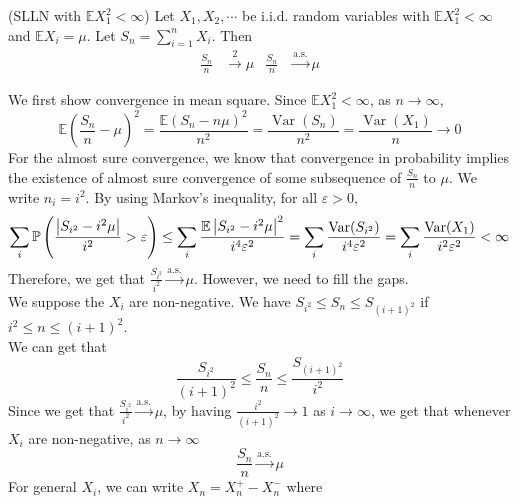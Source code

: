 \documentclass{huhtakm-template-book}
\newcommand{\prob}{\mathbb{P}}
\newcommand{\expect}{\mathbb{E}}
\DeclareMathOperator{\Var}{Var}
\begin{document}
\begin{thm}(SLLN with $\expect X_{1}^{2}<\infty$) Let $X_{1},X_{2},\cdots$ be i.i.d. random variables with $\expect X_{1}^{2}<\infty$ and $\expect X_{i}=\mu$. Let $S_{n}=\sum_{i=1}^{n}X_{i}$. Then
    \begin{align*}
        \frac{S_{n}}{n}&\xrightarrow{2}\mu & \frac{S_{n}}{n}&\xrightarrow{\text{a.s.}}\mu
    \end{align*}
\end{thm}
\begin{proofing}
    We first show convergence in mean square. Since $\expect X_{1}^{2}<\infty$, as $n\to\infty$,
    \begin{equation*}
        \expect\left(\frac{S_{n}}{n}-\mu\right)^{2}=\frac{\expect(S_{n}-n\mu)^{2}}{n^{2}}=\frac{\Var(S_{n})}{n^{2}}=\frac{\Var(X_{1})}{n}\to 0
    \end{equation*}
    For the almost sure convergence, we know that convergence in probability implies the existence of almost sure convergence of some subsequence of $\frac{S_{n}}{n}$ to $\mu$. We write $n_{i}=i^{2}$. By using Markov's inequality, for all $\varepsilon>0$,
    \begin{equation*}
        \sum_{i}\prob\left(\frac{\abs{S_{i^{2}}-i^{2}\mu}}{i^{2}}>\varepsilon\right)\leq\sum_{i}\frac{\expect\abs{S_{i^{2}}-i^{2}\mu}^{2}}{i^{4}\varepsilon^{2}}=\sum_{i}\frac{\Var(S_{i^{2}})}{i^{4}\varepsilon^{2}}=\sum_{i}\frac{\Var(X_{1})}{i^{2}\varepsilon^{2}}<\infty
    \end{equation*}
    Therefore, we get that $\frac{S_{i^{2}}}{i^{2}}\xrightarrow{\text{a.s.}}\mu$. However, we need to fill the gaps.\\
    We suppose the $X_{i}$ are non-negative. We have $S_{i^{2}}\leq S_{n}\leq S_{(i+1)^{2}}$ if $i^{2}\leq n\leq (i+1)^{2}$.\\
    We can get that
    \begin{equation*}
        \frac{S_{i^{2}}}{(i+1)^{2}}\leq\frac{S_{n}}{n}\leq\frac{S_{(i+1)^{2}}}{i^{2}}
    \end{equation*}
    Since we get that $\frac{S_{i^{2}}}{i^{2}}\xrightarrow{\text{a.s.}}\mu$, by having $\frac{i^{2}}{(i+1)^{2}}\to 1$ as $i\to\infty$, we get that whenever $X_{i}$ are non-negative, as $n\to\infty$
    \begin{equation*}
        \frac{S_{n}}{n}\xrightarrow{\text{a.s.}}\mu
    \end{equation*}
    For general $X_{i}$, we can write $X_{n}=X_{n}^{+}-X_{n}^{-}$ where
    \begin{align*}

\end{align*}
\end{proofing}
\end{document}
